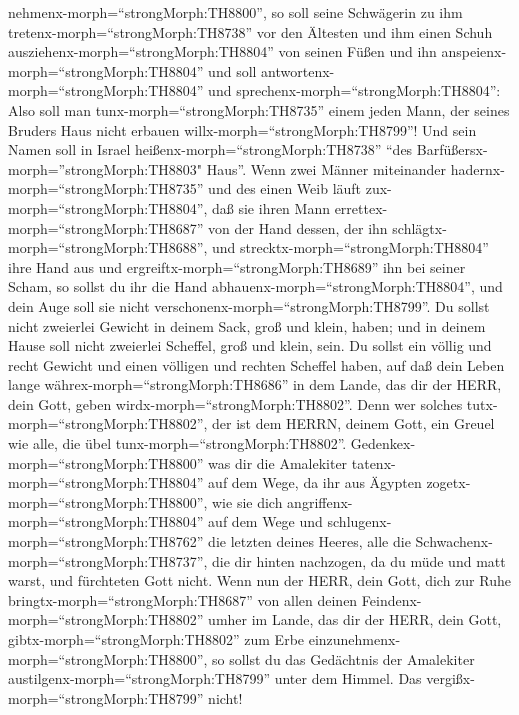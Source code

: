 nehmenx-morph=``strongMorph:TH8800'',  so soll seine
Schwägerin zu ihm tretenx-morph=``strongMorph:TH8738'' vor den Ältesten
und ihm einen Schuh ausziehenx-morph=``strongMorph:TH8804'' von seinen
Füßen und ihn anspeienx-morph=``strongMorph:TH8804'' und soll
antwortenx-morph=``strongMorph:TH8804'' und
sprechenx-morph=``strongMorph:TH8804'': Also soll man
tunx-morph=``strongMorph:TH8735'' einem jeden Mann, der seines Bruders
Haus nicht erbauen willx-morph=``strongMorph:TH8799''!  Und
sein Namen soll in Israel heißenx-morph=``strongMorph:TH8738'' ``des
Barfüßersx-morph=''strongMorph:TH8803" Haus''.  Wenn zwei
Männer miteinander hadernx-morph=``strongMorph:TH8735'' und des einen
Weib läuft zux-morph=``strongMorph:TH8804'', daß sie ihren Mann
errettex-morph=``strongMorph:TH8687'' von der Hand dessen, der ihn
schlägtx-morph=``strongMorph:TH8688'', und
strecktx-morph=``strongMorph:TH8804'' ihre Hand aus und
ergreiftx-morph=``strongMorph:TH8689'' ihn bei seiner Scham,
 so sollst du ihr die Hand
abhauenx-morph=``strongMorph:TH8804'', und dein Auge soll sie nicht
verschonenx-morph=``strongMorph:TH8799''.  Du sollst nicht
zweierlei Gewicht in deinem Sack, groß und klein, haben; 
und in deinem Hause soll nicht zweierlei Scheffel, groß und klein, sein.
 Du sollst ein völlig und recht Gewicht und einen völligen
und rechten Scheffel haben, auf daß dein Leben lange
währex-morph=``strongMorph:TH8686'' in dem Lande, das dir der HERR, dein
Gott, geben wirdx-morph=``strongMorph:TH8802''.  Denn wer
solches tutx-morph=``strongMorph:TH8802'', der ist dem HERRN, deinem
Gott, ein Greuel wie alle, die übel tunx-morph=``strongMorph:TH8802''.
 Gedenkex-morph=``strongMorph:TH8800'' was dir die
Amalekiter tatenx-morph=``strongMorph:TH8804'' auf dem Wege, da ihr aus
Ägypten zogetx-morph=``strongMorph:TH8800'',  wie sie dich
angriffenx-morph=``strongMorph:TH8804'' auf dem Wege und
schlugenx-morph=``strongMorph:TH8762'' die letzten deines Heeres, alle
die Schwachenx-morph=``strongMorph:TH8737'', die dir hinten nachzogen,
da du müde und matt warst, und fürchteten Gott nicht.  Wenn
nun der HERR, dein Gott, dich zur Ruhe
bringtx-morph=``strongMorph:TH8687'' von allen deinen
Feindenx-morph=``strongMorph:TH8802'' umher im Lande, das dir der HERR,
dein Gott, gibtx-morph=``strongMorph:TH8802'' zum Erbe
einzunehmenx-morph=``strongMorph:TH8800'', so sollst du das Gedächtnis
der Amalekiter austilgenx-morph=``strongMorph:TH8799'' unter dem Himmel.
Das vergißx-morph=``strongMorph:TH8799'' nicht!

